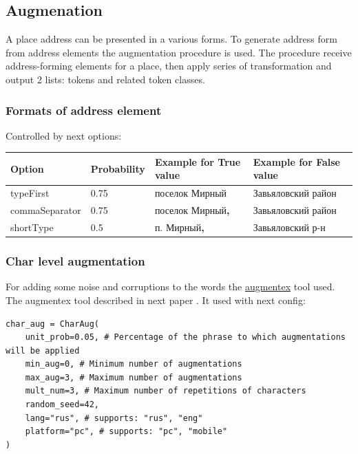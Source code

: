 \documentclass{article}
\begin{document}
\subsection{Augmenation}

A place address can be presented in a various forms.
To generate address form from address elements the augmentation procedure is used.
The procedure receive address-forming elements for a place, then apply series of transformation and output 2 lists: tokens and related token classes.

\subsubsection{Formats of address element}

Controlled by next options:

\begin{center}
    \begin{tabular}{| l | l | l |  l | }
        \hline
        Option & Probability & Example for True value & Example for False value \\
        \hline
        typeFirst & 0.75 & поселок Мирный & Завьяловский район  \\
        commaSeparator & 0.75 & поселок Мирный\textbf{,} & Завьяловский район  \\
        shortType & 0.5 & п. Мирный\textbf{,} & Завьяловский р-н  \\
        \hline
    \end{tabular}
\end{center}



\subsubsection{Char level augmentation}

For adding some noise and corruptions to the words the \href{https://github.com/ai-forever/augmentex}{augmentex} tool used.
The augmentex tool described in next paper \cite{martynov2023augmentation}.
It used with next config:

\begin{verbatim}
char_aug = CharAug(
    unit_prob=0.05, # Percentage of the phrase to which augmentations will be applied
    min_aug=0, # Minimum number of augmentations
    max_aug=3, # Maximum number of augmentations
    mult_num=3, # Maximum number of repetitions of characters
    random_seed=42,
    lang="rus", # supports: "rus", "eng"
    platform="pc", # supports: "pc", "mobile"
)

\end{verbatim}
\end{document}
